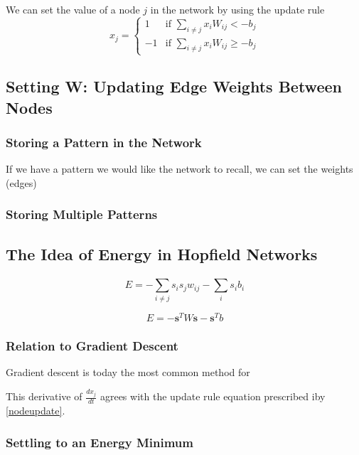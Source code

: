 \documentclass{article}
\begin{document}
	We can set the value of a node $j$ in the network by using the update rule 
	\begin{equation}\label{nodeupdate}
	x_j = \begin{cases}
		 1  & \text{if } \sum^{}_{i \neq j} x_i W_{ij}  < -b_j \\
		-1  & \text{if } \sum^{}_{i \neq j} x_i W_{ij} \ge -b_j
	\end{cases}
	\end{equation}
	
	\subsection{Setting W: Updating Edge Weights Between Nodes}
	
	
	\subsubsection{Storing a Pattern in the Network}
	
	If we have a pattern we would like the network to recall, we can set the weights (edges) 
	
	\subsubsection{Storing Multiple Patterns}	
	
	\subsection{The Idea of Energy in Hopfield Networks}
	\begin{equation}
		E = - \sum^{}_{i \neq j} s_i s_j w_{ij} - \sum^{}_{i} s_i b_i
	\end{equation}		
	
	\begin{equation}
		E = -\mathbf{s}^T W\mathbf{s} - \mathbf{s}^T b	
	\end{equation}
	
	\subsubsection{Relation to Gradient Descent}
	Gradient descent is today the most common method for 
	
	This derivative of $\frac{d x_j}{dt}$ agrees with the update rule equation prescribed iby \ref{nodeupdate}.
	
	\subsubsection{Settling to an Energy Minimum}
	
\end{document}
